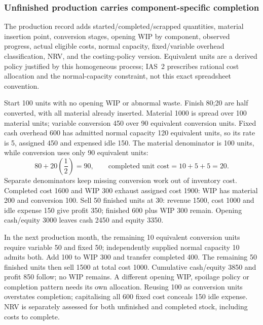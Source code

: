 

\hypertarget{unfinished-production-carries-component-specific-completion}{%
\subsubsection{Unfinished production carries component-specific completion}\label{unfinished-production-carries-component-specific-completion}}

The production record adds started/completed/scrapped quantities, material insertion point, conversion stages, opening WIP by component, observed progress, actual eligible costs, normal capacity, fixed/variable overhead classification, NRV, and the costing-policy version. Equivalent units are a derived policy justified by this homogeneous process; IAS~2 \citep[IAS~2.12--18]{eu20231803} prescribes rational cost allocation and the normal-capacity constraint, not this exact spreadsheet convention.

Start 100 units with no opening WIP or abnormal waste. Finish 80;20 are half converted, with all material already inserted. Material 1000 is spread over 100 material units; variable conversion 450 over 90 equivalent conversion units. Fixed cash overhead 600 has admitted normal capacity 120 equivalent units, so its rate is 5, assigned 450 and expensed idle 150. The material denominator is 100 units, while conversion uses only 90 equivalent units:
\[80+20\left(\frac12\right)=90,\qquad\text{completed unit cost}=10+5+5=20.\]
Separate denominators keep missing conversion work out of inventory cost. Completed cost 1600 and WIP 300 exhaust assigned cost 1900: WIP has material 200 and conversion 100. Sell 50 finished units at 30: revenue 1500, cost 1000 and idle expense 150 give profit 350; finished 600 plus WIP 300 remain. Opening cash/equity 3000 leaves cash 2450 and equity 3350.

In the next production month, the remaining 10 equivalent conversion units require variable 50 and fixed 50; independently supplied normal capacity 10 admits both. Add 100 to WIP 300 and transfer completed 400. The remaining 50 finished units then sell 1500 at total cost 1000. Cumulative cash/equity 3850 and profit 850 follow; no WIP remains. A different opening WIP, spoilage policy or completion pattern needs its own allocation. Reusing 100 as conversion units overstates completion; capitalising all 600 fixed cost conceals 150 idle expense. NRV is separately assessed for both unfinished and completed stock, including costs to complete.

